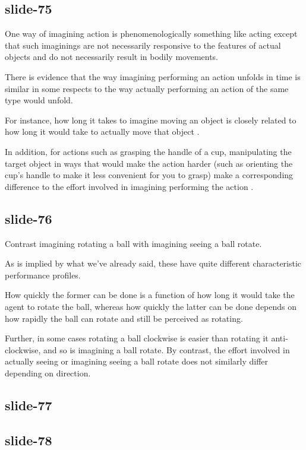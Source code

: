 \documentclass[12pt,\papersize]{extarticle}
\begin{document}
\subsection{slide-75}
One way of imagining action is phenomenologically something like acting except
that such imaginings are not necessarily responsive to the features of actual
objects and do not necessarily result in bodily movements.

There is evidence that the way imagining performing an action unfolds in time is
similar in some respects to the way actually performing an action of the same type would unfold.

For instance, how long it takes to imagine moving an object is closely related to
how long it would take to actually move that object \citep{decety:1989_timing,
decety:1996_imagined, Jeannerod:1994oz}.

In addition, for actions such as grasping the handle of a cup, manipulating the
target object in ways that would make the action harder (such as orienting the cup's
handle to make it less convenient for you to grasp) make a corresponding difference to
the effort involved in imagining performing the action \citep{parsons:1994_temporal,
frak:2001_orientation}.

\subsection{slide-76}
Contrast imagining rotating a ball with imagining seeing a ball rotate.

As is implied by what we’ve already said, these have quite different characteristic performance profiles.

How quickly the former can be done is a function of how long it would take the agent to rotate the ball, whereas how quickly the latter can be done depends on how rapidly the ball can rotate and still be perceived as rotating.

Further, in some cases rotating a ball clockwise is easier than rotating it anti-clockwise, and so is imagining a ball rotate.  By contrast, the effort involved in actually seeing or imagining seeing a ball rotate does not similarly differ depending on direction.

\subsection{slide-77}

\subsection{slide-78}
\end{document}
